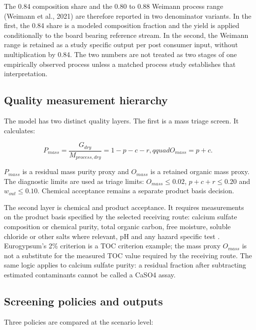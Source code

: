 \documentclass[pdflatex,sn-basic]{sn-jnl}
\begin{document}
The 0.84 composition share and the 0.80 to 0.88 Weimann process range (Weimann et al., 2021) are therefore reported in two denominator variants. In the first, the 0.84 share is a modeled composition fraction and the yield is applied conditionally to the board bearing reference stream. In the second, the Weimann range is retained as a study specific output per post consumer input, without multiplication by 0.84. The two numbers are not treated as two stages of one empirically observed process unless a matched process study establishes that interpretation.

\subsection{Quality measurement hierarchy}\label{quality-measurement-hierarchy}

The model has two distinct quality layers. The first is a mass triage screen. It calculates:

\[
P_{mass}=\frac{G_{dry}}{M_{process,dry}}=1-p-c-r,qquad
O_{mass}=p+c.
\]

\(P_{mass}\) is a residual mass purity proxy and \(O_{mass}\) is a retained organic mass proxy. The diagnostic limits are used as triage limits: \(O_{mass}\leq0.02\), \(p+c+r\leq0.20\) and \(w_{out}\leq0.10\). Chemical acceptance remains a separate product basis decision.

The second layer is chemical and product acceptance. It requires measurements on the product basis specified by the selected receiving route: calcium sulfate composition or chemical purity, total organic carbon, free moisture, soluble chloride or other salts where relevant, pH and any hazard specific test \citep{eurogypsum2024,bundesverband2013}. Eurogypsum's 2\% criterion is a TOC criterion example; the mass proxy \(O_{mass}\) is not a substitute for the measured TOC value required by the receiving route. The same logic applies to calcium sulfate purity: a residual fraction after subtracting estimated contaminants cannot be called a CaSO4 assay.

\subsection{Screening policies and outputs}\label{screening-policies-and-outputs}

Three policies are compared at the scenario level:
\end{document}
